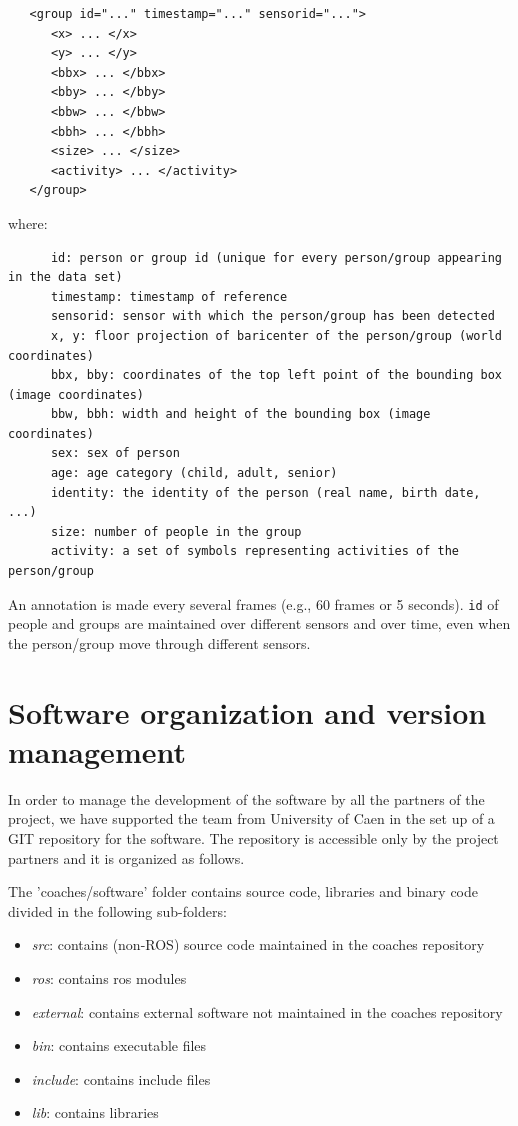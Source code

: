 \documentclass{article}
\begin{document}
\begin{verbatim}
   <group id="..." timestamp="..." sensorid="...">
      <x> ... </x>
      <y> ... </y>
      <bbx> ... </bbx>
      <bby> ... </bby>
      <bbw> ... </bbw>
      <bbh> ... </bbh>
      <size> ... </size>
      <activity> ... </activity>
   </group> 
\end{verbatim}

where:


\begin{verbatim}
      id: person or group id (unique for every person/group appearing in the data set)
      timestamp: timestamp of reference
      sensorid: sensor with which the person/group has been detected
      x, y: floor projection of baricenter of the person/group (world coordinates)
      bbx, bby: coordinates of the top left point of the bounding box (image coordinates)
      bbw, bbh: width and height of the bounding box (image coordinates)
      sex: sex of person 
      age: age category (child, adult, senior)
      identity: the identity of the person (real name, birth date, ...)
      size: number of people in the group
      activity: a set of symbols representing activities of the person/group
\end{verbatim}

An annotation is made every several frames (e.g., 60 frames or 5 seconds). {\tt id} of people and groups are maintained over different sensors and over time, even when the person/group move through different sensors.


\section{Software organization and version management}

In order to manage the development of the software by all the partners of the project, we have supported the team from University of Caen in the set up of a GIT repository for the software.
The repository is accessible only by the project partners and it is organized as follows.

The 'coaches/software' folder contains source code, libraries and binary code 
divided in the following sub-folders:

\begin{itemize}
\item \emph{src}:       contains (non-ROS) source code maintained in the coaches repository
\item \emph{ros}:       contains ros modules
\item \emph{external}:  contains external software not maintained in the coaches repository
\item \emph{bin}:       contains executable files
\item \emph{include}:   contains include files 
\item \emph{lib}:       contains libraries
\end{itemize}
\end{document}
